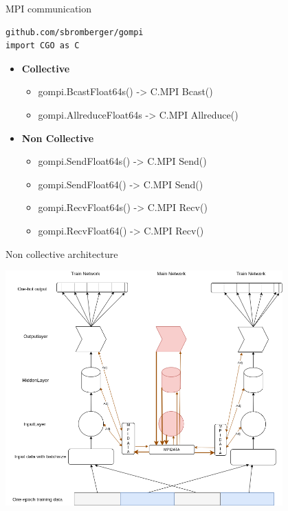 \documentclass[presentation]{beamer}
\begin{document}
\begin{frame}[label={sec:orgbfc7db6},fragile]{MPI communication}
 \begin{verbatim}
github.com/sbromberger/gompi
import CGO as C
\end{verbatim}

\begin{itemize}
\item \textbf{Collective}
\begin{itemize}
\item gompi.BcastFloat64s() -> C.MPI \textunderscore Bcast()
\item gompi.AllreduceFloat64s -> C.MPI \textunderscore Allreduce()
\end{itemize}

\item \textbf{Non Collective}
\begin{itemize}
\item gompi.SendFloat64s() -> C.MPI \textunderscore Send()
\item gompi.SendFloat64() -> C.MPI \textunderscore Send()
\item gompi.RecvFloat64s() -> C.MPI \textunderscore Recv()
\item gompi.RecvFloat64() -> C.MPI \textunderscore Recv()
\end{itemize}
\end{itemize}
\end{frame}

\begin{frame}[label={sec:org1c55666}]{Non collective architecture}
\begin{center}
\includegraphics[width=0.8\textwidth]{./png/MPINetworkSendRecv.png}
\end{center}
\end{frame}
\end{document}
